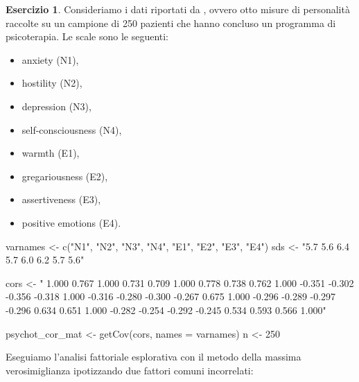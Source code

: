 \documentclass[
  11pt,
]{krantz}
\makeatletter
\newenvironment{Shaded}{\begin{snugshade}}{\end{snugshade}}
\newcommand{\AttributeTok}[1]{\textcolor[rgb]{0.61,0.61,0.61}{#1}}
\newcommand{\DecValTok}[1]{\textcolor[rgb]{0.06,0.06,0.06}{#1}}
\newcommand{\FunctionTok}[1]{\textcolor[rgb]{0,0,0}{#1}}
\newcommand{\NormalTok}[1]{#1}
\newcommand{\OtherTok}[1]{\textcolor[rgb]{0.37,0.37,0.37}{#1}}
\newcommand{\StringTok}[1]{\textcolor[rgb]{0.5,0.5,0.5}{#1}}
\providecommand{\tightlist}{%
  \setlength{\itemsep}{0pt}\setlength{\parskip}{0pt}}
\newenvironment{kframe}{%
\medskip{}
\setlength{\fboxsep}{.8em}
 \def\at@end@of@kframe{}%
 \ifinner\ifhmode%
  \def\at@end@of@kframe{\end{minipage}}%
  \begin{minipage}{\columnwidth}%
 \fi\fi%
 \def\FrameCommand##1{\hskip\@totalleftmargin \hskip-\fboxsep
 \colorbox{shadecolor}{##1}\hskip-\fboxsep
     \hskip-\linewidth \hskip-\@totalleftmargin \hskip\columnwidth}%
 \MakeFramed {\advance\hsize-\width
   \@totalleftmargin\z@ \linewidth\hsize
   \@setminipage}}%
 {\par\unskip\endMakeFramed%
 \at@end@of@kframe}
\renewenvironment{Shaded}{\begin{kframe}}{\end{kframe}}
\theoremstyle{definition}
\theoremstyle{definition}
\theoremstyle{definition}
\newtheorem{exercise}{Esercizio}[chapter]
\theoremstyle{definition}
\theoremstyle{remark}
\makeatother
\begin{document}
\begin{exercise}

Consideriamo i dati riportati da \citet{brown2015confirmatory}, ovvero otto misure di personalità raccolte su un campione di 250 pazienti che hanno concluso un programma di psicoterapia. Le scale sono le seguenti:

\begin{itemize}
\tightlist
\item
  anxiety (N1),
\item
  hostility (N2),
\item
  depression (N3),
\item
  self-consciousness (N4),
\item
  warmth (E1),
\item
  gregariousness (E2),
\item
  assertiveness (E3),
\item
  positive emotions (E4).
\end{itemize}

\begin{Shaded}
\begin{Highlighting}[]
\NormalTok{varnames }\OtherTok{\textless{}{-}} \FunctionTok{c}\NormalTok{(}\StringTok{"N1"}\NormalTok{, }\StringTok{"N2"}\NormalTok{, }\StringTok{"N3"}\NormalTok{, }\StringTok{"N4"}\NormalTok{, }\StringTok{"E1"}\NormalTok{, }\StringTok{"E2"}\NormalTok{, }\StringTok{"E3"}\NormalTok{, }\StringTok{"E4"}\NormalTok{)}
\NormalTok{sds }\OtherTok{\textless{}{-}} \StringTok{"5.7  5.6  6.4  5.7  6.0  6.2  5.7  5.6"}

\NormalTok{cors }\OtherTok{\textless{}{-}} \StringTok{"}
\StringTok{ 1.000}
\StringTok{ 0.767  1.000}
\StringTok{ 0.731  0.709  1.000}
\StringTok{ 0.778  0.738  0.762  1.000}
\StringTok{{-}0.351  {-}0.302  {-}0.356  {-}0.318  1.000}
\StringTok{{-}0.316  {-}0.280  {-}0.300  {-}0.267  0.675  1.000}
\StringTok{{-}0.296  {-}0.289  {-}0.297  {-}0.296  0.634  0.651  1.000}
\StringTok{{-}0.282  {-}0.254  {-}0.292  {-}0.245  0.534  0.593  0.566  1.000"}

\NormalTok{psychot\_cor\_mat }\OtherTok{\textless{}{-}} \FunctionTok{getCov}\NormalTok{(cors, }\AttributeTok{names =}\NormalTok{ varnames)}
\NormalTok{n }\OtherTok{\textless{}{-}} \DecValTok{250}
\end{Highlighting}
\end{Shaded}

Eseguiamo l'analisi fattoriale esplorativa con il metodo della massima verosimiglianza ipotizzando due fattori comuni incorrelati:


\end{exercise}
\end{document}
